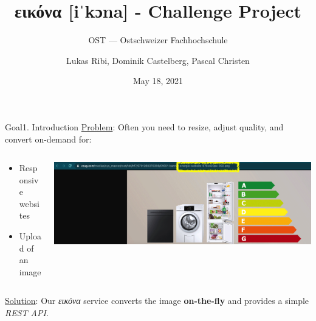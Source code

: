 \documentclass[aspectratio=169,20pt]{beamer}
\title{εικόνα [iˈkɔna] - Challenge Project}
\subtitle{OST — Ostschweizer Fachhochschule}
\date{May 18, 2021}
\author{Lukas Ribi, Dominik Castelberg, Pascal Christen}
\institute{DS1 - Thomas Bocek }
\begin{document}
\begin{frame}
	\titlepage
\end{frame}

\begin{frame}{Goal}{1. Introduction}
	\underline{Problem}: Often you need to resize, adjust quality, and convert on-demand for:
	\vspace{1in}
	\begin{columns}[onlytextwidth,T]
		\begin{column}{.25\linewidth}
			\begin{itemize}
				\item{Responsive websites}
				\item{Upload of an image}
			\end{itemize}
		\end{column}
		\begin{column}{.65\linewidth}
			\includegraphics[scale=0.55]{vzug}
		\end{column}
	\end{columns}
	\underline{Solution}: Our \textit{εικόνα} service converts the image \textbf{on-the-fly} and provides a simple \textit{REST API}.
\end{frame}
\end{document}
